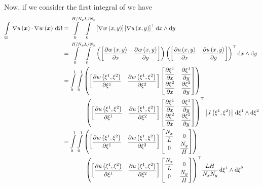 Now, if we consider the first integral of  we have
\begin{equation}
  \begin{aligned}
    \gint{\Omega}{}{\dotprod{\gradient{}{\fnof{u}{\vectr{x}}}}{\gradient{}{\fnof{w}{\vectr{x}}}}}{\Omega}
    &=\giint{0}{H/N_{y}}{0}{L/N_{x}}{\sqbrac{\gradient{}{\fnof{w}{x,y}}}
      \transpose{\sqbrac{\gradient{}{\fnof{u}{x,y}}}}}{x}{y}\\
    &=\giint{0}{H/N_{y}}{0}{L/N_{x}}{
      \pbrac{\begin{bmatrix}\delby{\fnof{w}{x,y}}{x}&\delby{\fnof{w}{x,y}}{y}\end{bmatrix}}
      \transpose{\pbrac{\begin{bmatrix}\delby{\fnof{u}{x,y}}{x}&\delby{\fnof{u}{x,y}}{y}\end{bmatrix}}}}{x}{y} \\
    &=\dintl{0}{1}\dintl{0}{1}\pbrac{\begin{bmatrix}
          \delby{\fnof{w}{\xione,\xitwo}}{\xione}&\delby{\fnof{w}{\xione,\xitwo}}{\xitwo}
        \end{bmatrix}\begin{bmatrix}
          \delby{\xione}{x} & \delby{\xione}{y} \\
          \delby{\xitwo}{x} & \delby{\xitwo}{y}
    \end{bmatrix}} \\
    &\qquad\qquad\transpose{\pbrac{\begin{bmatrix}
          \delby{\fnof{u}{\xione,\xitwo}}{\xione}&\delby{\fnof{u}{\xione,\xitwo}}{\xitwo}
        \end{bmatrix}\begin{bmatrix}
          \delby{\xione}{x} & \delby{\xione}{y} \\
          \delby{\xitwo}{x} & \delby{\xitwo}{y}
    \end{bmatrix}}} \abs{\fnof{J}{\xione,\xitwo}}\infinitesimaltwo{\xione}{\xitwo} \\ 
    &=\dintl{0}{1}\dintl{0}{1}\pbrac{\begin{bmatrix}
        \delby{\fnof{w}{\xione,\xitwo}}{\xione}&\delby{\fnof{w}{\xione,\xitwo}}{\xitwo}
      \end{bmatrix}\begin{bmatrix}
        \dfrac{N_{x}}{L} & 0 \\
        0 & \dfrac{N_{y}}{H}
        \end{bmatrix}} \\
    &\qquad\qquad\transpose{\pbrac{\begin{bmatrix}
          \delby{\fnof{u}{\xione,\xitwo}}{\xione}&\delby{\fnof{u}{\xione,\xitwo}}{\xitwo}
        \end{bmatrix}\begin{bmatrix}
          \dfrac{N_{x}}{L} & 0 \\
          0 & \dfrac{N_{y}}{H}
    \end{bmatrix}}}\dfrac{LH}{N_{x}N_{y}}\infinitesimaltwo{\xione}{\xitwo}
  \end{aligned}
\end{equation}

